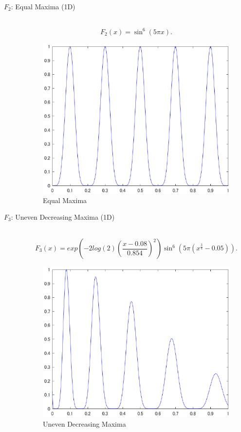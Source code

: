 \documentclass[a4j,11pt]{jarticle}
\begin{document}
\begin{description}
\item[$F_2$: Equal Maxima (1D)]\mbox{}\\
\begin{equation}
\label{eq:F2}
F_2(x)=\sin^6{(5\pi x)}.
\end{equation}
\begin{figure}[h]
\centering
\includegraphics[width=0.8\linewidth]{eps/F2.eps}
\caption{Equal Maxima}
\label{fig:f2}
\end{figure}

\item[$F_3$: Uneven Decreasing Maxima (1D)]\mbox{}\\
\begin{equation}
\label{eq:F3}
F_3(x)=exp(-2log(2)(\frac{x-0.08}{0.854})^2)\sin^6{(5\pi(x^{\frac{3}{4}}-0.05))}.
\end{equation}
\begin{figure}[h]
\centering
\includegraphics[width=0.8\linewidth]{eps/F3.eps}
\caption{Uneven Decreasing Maxima}
\label{fig:f3}
\end{figure}


\end{description}
\end{document}
